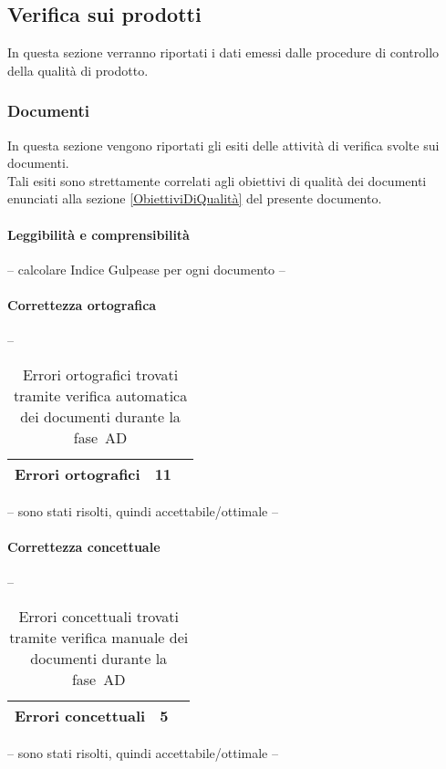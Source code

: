 \documentclass[../PianoDiQualifica.tex]{subfiles}
\begin{document}
\begin{appendices}
			
	\subsection{Verifica sui prodotti}
	In questa sezione verranno riportati i dati emessi dalle procedure di controllo della qualità di prodotto\g.
		\subsubsection{Documenti}
		In questa sezione vengono riportati gli esiti delle attività di verifica svolte sui documenti.\\
		Tali esiti sono strettamente correlati agli obiettivi di qualità dei documenti enunciati alla sezione \ref{ObiettiviDiQualità} del presente documento.
			\paragraph{Leggibilità e comprensibilità}
			-- calcolare Indice Gulpease per ogni documento --
			
			\paragraph{Correttezza ortografica}
			--
			\begin{table}[H]
				\centering
				\begin{tabular}{l * {2}{c}}
					\midrule
					Errori ortografici & 11 \\
					\midrule
				\end{tabular}
				\caption{Errori ortografici trovati tramite verifica automatica dei documenti durante la fase\g\ AD}
				\label{tab:errori_automatica}
			\end{table}
			-- sono stati risolti, quindi accettabile/ottimale -- 
			
			\paragraph{Correttezza concettuale}
			--
			\begin{table}[H]
				\centering
				\begin{tabular}{l * {2}{c}}
					\midrule
					Errori concettuali & 5 \\
					\midrule
				\end{tabular}
				\caption{Errori concettuali trovati tramite verifica manuale dei documenti durante la fase\g\ AD}
				\label{tab:errori_automatica}
			\end{table}
			-- sono stati risolti, quindi accettabile/ottimale -- 
			
\end{appendices}
\end{document}
